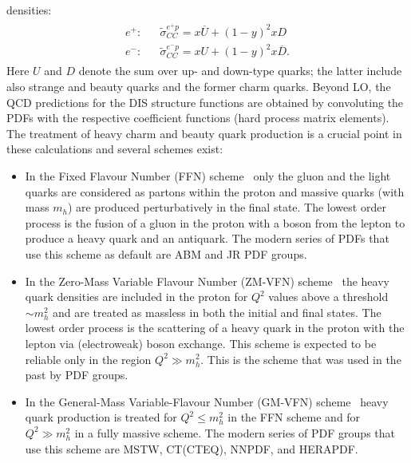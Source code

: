densities:
\begin{eqnarray}
    \begin{array}{rll}
   e^{+}:  & & \tilde \sigma_{CC}^{e^{+} p} = 
                x\overline U + (1-y)^2 xD  \\
   e^{-}:  & & \tilde \sigma_{CC}^{e^{-} p} = 
                xU + (1-y)^2 x\overline D.
    \end{array}
\end{eqnarray}
Here $U$ and $D$ denote the sum over up- and down-type quarks;
the latter include also strange and beauty quarks and 
the former charm quarks.
%
Beyond LO, 
the QCD predictions for the DIS structure functions are obtained by convoluting 
the PDFs with the respective coefficient functions (hard process matrix elements).
%
The treatment of 
heavy charm and beauty quark production is a crucial point in these calculations
and several schemes exist:
\begin{itemize}
\item
In the Fixed Flavour Number (FFN) 
scheme~\cite{Laenen:1992, Laenen:1993, Riem:1995}
 only the gluon and the light quarks are considered
as partons within the proton and massive 
quarks (with mass $m_h$) are produced perturbatively in the final state.
The lowest order process is the fusion of a gluon in the proton
with a boson from the lepton to produce a heavy quark and an antiquark.
The modern series of PDFs that use this scheme as default are ABM and JR PDF groups.
\item
In the Zero-Mass Variable Flavour Number (ZM-VFN) scheme~\cite{ZMVFNpub} the
heavy quark densities are included in the proton for $Q^2$ values above a threshold $\sim m_h^2$
and
are treated as massless in both the initial 
and final states. The lowest order process is the scattering
of a heavy quark in the proton with the lepton via (electroweak) boson exchange.
This scheme is expected to be reliable only in the region $Q^2 \gg m_h^2$.
This is the scheme that was used in the past by PDF groups.
\item
In the General-Mass Variable-Flavour Number (GM-VFN)
scheme~\cite{VFN} heavy quark production is treated for
$Q^2 \le m_h^2$ in the FFN scheme and for $Q^2 \gg m_h^2$
in a fully massive scheme. 
The modern series of PDF groups that use this scheme are MSTW, CT(CTEQ), NNPDF, and HERAPDF.
\end{itemize}
